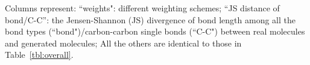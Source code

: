 \begin{table}
\begin{small}
\begin{threeparttable}
\begin{tabular}
		\bottomrule
	\end{tabular}%
	\begin{tablenotes}
		\begin{footnotesize}
	\item 
\!\!Columns represent: 
``weights": different weighting schemes;
``JS distance of bond/C-C'': the Jensen-Shannon (JS) divergence of bond length among all the bond types (``bond")/carbon-carbon single bonds (``C-C") between real molecules and generated molecules; 
All the others are identical to those in Table~\ref{tbl:overall}. 
		\par
		\end{footnotesize}
	\end{tablenotes}
\end{threeparttable}
\end{small}
\end{table}
